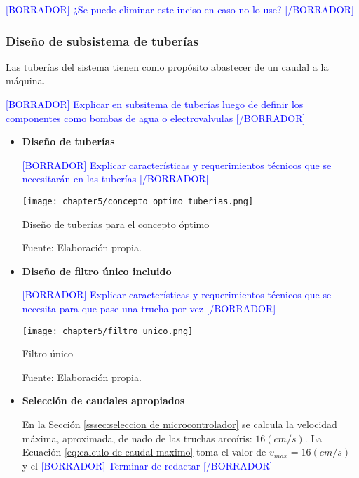 \textcolor{blue}{[BORRADOR] ¿Se puede eliminar este inciso en caso no lo use? [/BORRADOR]} 

\subsubsection{Diseño de subsistema de tuberías}

Las tuberías del sistema tienen como propósito abastecer de un caudal a la máquina.

\textcolor{blue}{[BORRADOR] Explicar en subsitema de tuberías luego de definir los componentes como bombas de agua o electrovalvulas [/BORRADOR]} 

\begin{itemize}
	
	\item \textbf{Diseño de tuberías}
	
	\textcolor{blue}{[BORRADOR] Explicar características y requerimientos técnicos que se necesitarán en las tuberías [/BORRADOR]} 
	
	\begin{myfigure}[H]
		\centering
		\texttt{[image: chapter5/concepto optimo tuberias.png]}
		\caption{Diseño de tuberías para el concepto óptimo}
		\begin{myflushleftportland}
			Fuente: Elaboración propia.
		\end{myflushleftportland}
		\label{fig:concepto optimo tuberias}
	\end{myfigure}
	
	\item \textbf{Diseño de filtro único incluido}
	
	\textcolor{blue}{[BORRADOR] Explicar características y requerimientos técnicos que se necesita para que pase una trucha por vez [/BORRADOR]} 
	
	\begin{myfigure}[H]
		\centering
		\texttt{[image: chapter5/filtro unico.png]}
		\caption{Filtro único}
		\begin{myflushleftportland}
			Fuente: Elaboración propia.
		\end{myflushleftportland}
		\label{fig:filtro unico}
	\end{myfigure}
	
	\item \textbf{Selección de caudales apropiados} 
	
	En la Sección \ref{sssec:seleccion de microcontrolador} se calcula la velocidad máxima, aproximada, de nado de las truchas arcoíris: $16 (cm/s)$. La Ecuación \ref{eq:calculo de caudal maximo} toma el valor de \textit{$v_{max}=16 (cm/s)$}  y el \textcolor{blue}{[BORRADOR] Terminar de redactar [/BORRADOR]} 
	

\end{itemize}
